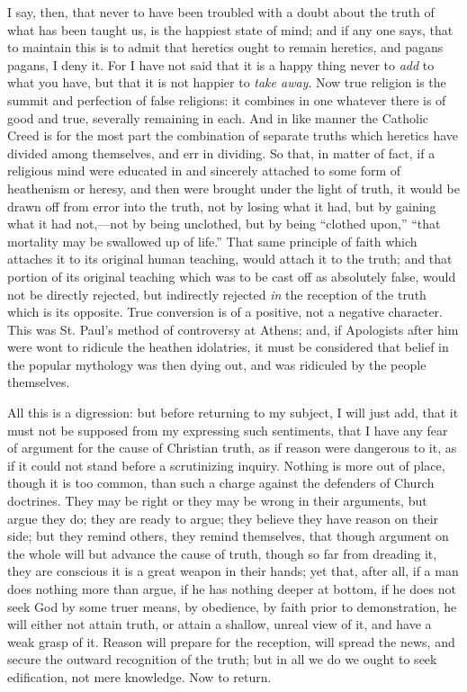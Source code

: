 I say, then, that never to have been troubled with a doubt about
the truth of what has been taught us, is the happiest state of mind;
and if any one says, that to maintain this is to admit that heretics
ought to remain heretics, and pagans pagans, I deny it. For I have not
said that it is a happy thing never to \emph{add} to what you have,
but that it is not happier to \emph{take away}. Now true religion is
the summit and perfection of false religions: it combines in one
whatever there is of good and true, severally remaining in each. And
in like manner the Catholic Creed is for the most part the combination
of separate truths which heretics have divided among themselves, and
err in dividing. So that, in matter of fact, if a religious mind were
educated in and sincerely attached to some form of heathenism or
heresy, and then were brought under the light of truth, it would be
drawn off from error into the truth, not by losing what it had, but by
gaining what it had not,—not by being unclothed, but by being
``clothed upon,'' ``that mortality may be swallowed up of
life.'' That same principle of faith which attaches it to its
original human teaching, would attach it to the truth; and that
portion of its original teaching which was to be cast off as
absolutely false, would not be directly rejected, but indirectly
rejected \emph{in} the reception of the truth which is its opposite.
True conversion is of a positive, not a negative character. This was
St. Paul's method of controversy at Athens; and, if Apologists after
him were wont to ridicule the heathen idolatries, it must be
considered that belief in the popular mythology was then dying
out, and was ridiculed by the people themselves.

All this is a digression: but before returning to my subject, I
will just add, that it must not be supposed from my expressing such
sentiments, that I have any fear of argument for the cause of
Christian truth, as if reason were dangerous to it, as if it could not
stand before a scrutinizing inquiry. Nothing is more out of place,
though it is too common, than such a charge against the defenders of
Church doctrines. They may be right or they may be wrong in their
arguments, but argue they do; they are ready to argue; they believe
they have reason on their side; but they remind others, they remind
themselves, that though argument on the whole will but advance the
cause of truth, though so far from dreading it, they are conscious it
is a great weapon in their hands; yet that, after all, if a man does
nothing more than argue, if he has nothing deeper at bottom, if he
does not seek God by some truer means, by obedience, by faith prior to
demonstration, he will either not attain truth, or attain a shallow,
unreal view of it, and have a weak grasp of it. Reason will prepare
for the reception, will spread the news, and secure the outward
recognition of the truth; but in all we do we ought to seek
edification, not mere knowledge. Now to return.

